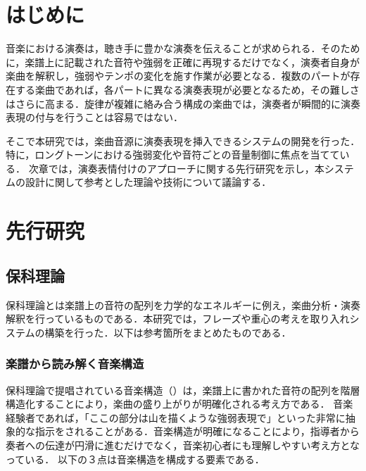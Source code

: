 



\section{はじめに}

音楽における演奏は，聴き手に豊かな演奏を伝えることが求められる．そのために，楽譜上に記載された音符や強弱を正確に再現するだけでなく，演奏者自身が楽曲を解釈し，強弱やテンポの変化を施す作業が必要となる．複数のパートが存在する楽曲であれば，各パートに異なる演奏表現が必要となるため，その難しさはさらに高まる．旋律が複雑に絡み合う構成の楽曲では，演奏者が瞬間的に演奏表現の付与を行うことは容易ではない．

そこで本研究では，楽曲音源に演奏表現を挿入できるシステムの開発を行った．特に，ロングトーンにおける強弱変化や音符ごとの音量制御に焦点を当てている． 次章では，演奏表情付けのアプローチに関する先行研究を示し，本システムの設計に関して参考とした理論や技術について議論する．



\section{先行研究}
\subsection{保科理論}
保科理論\cite{Hoshina98}とは楽譜上の音符の配列を力学的なエネルギーに例え，楽曲分析・演奏解釈を行っているものである．本研究では，フレーズや重心の考えを取り入れシステムの構築を行った．以下は参考箇所をまとめたものである．

\subsubsection{楽譜から読み解く音楽構造}
保科理論で提唱されている音楽構造（）は，楽譜上に書かれた音符の配列を階層構造化することにより，楽曲の盛り上がりが明確化される考え方である．
音楽経験者であれば，「ここの部分は山を描くような強弱表現で」といった非常に抽象的な指示をされることがある．音楽構造が明確になることにより，指導者から奏者への伝達が円滑に進むだけでなく，音楽初心者にも理解しやすい考え方となっている．
以下の３点は音楽構造を構成する要素である．


